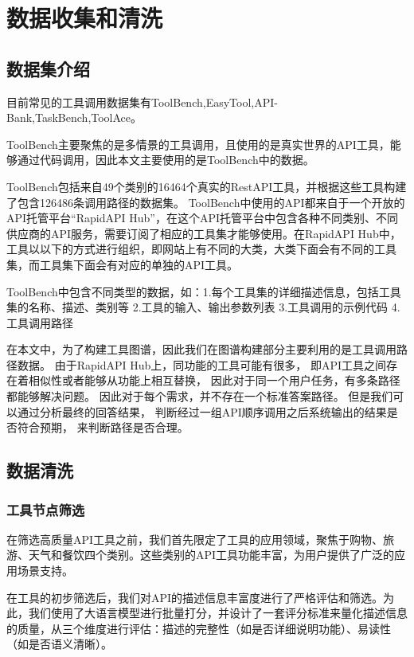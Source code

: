 \section{数据收集和清洗}

\subsection{数据集介绍}

目前常见的工具调用数据集有ToolBench\cite{Qin2023},EasyTool\cite{yuan2024easytool},API-Bank\cite{Li2023c},TaskBench\cite{shen2023taskbench},ToolAce\cite{liu2024toolace}。

ToolBench主要聚焦的是多情景的工具调用，且使用的是真实世界的API工具，能够通过代码调用，因此本文主要使用的是ToolBench中的数据。

ToolBench包括来自49个类别的16464个真实的RestAPI工具，并根据这些工具构建了包含126486条调用路径的数据集。
ToolBench中使用的API都来自于一个开放的API托管平台“RapidAPI Hub”，在这个API托管平台中包含各种不同类别、不同供应商的API服务，需要订阅了相应的工具集才能够使用。在RapidAPI Hub中，工具以以下的方式进行组织，即网站上有不同的大类，大类下面会有不同的工具集，而工具集下面会有对应的单独的API工具。

ToolBench中包含不同类型的数据，如：1.每个工具集的详细描述信息，包括工具集的名称、描述、类别等 2.工具的输入、输出参数列表 3.工具调用的示例代码 4.工具调用路径

在本文中，为了构建工具图谱，因此我们在图谱构建部分主要利用的是工具调用路径数据。
由于RapidAPI Hub上，同功能的工具可能有很多，
即API工具之间存在着相似性或者能够从功能上相互替换，
因此对于同一个用户任务，有多条路径都能够解决问题。
因此对于每个需求，并不存在一个标准答案路径。
但是我们可以通过分析最终的回答结果，
判断经过一组API顺序调用之后系统输出的结果是否符合预期，
来判断路径是否合理。

\subsection{数据清洗}

\subsubsection{工具节点筛选}

在筛选高质量API工具之前，我们首先限定了工具的应用领域，聚焦于购物、旅游、天气和餐饮四个类别。这些类别的API工具功能丰富，为用户提供了广泛的应用场景支持。

在工具的初步筛选后，我们对API的描述信息丰富度进行了严格评估和筛选。为此，我们使用了大语言模型进行批量打分，并设计了一套评分标准来量化描述信息的质量，从三个维度进行评估：描述的完整性（如是否详细说明功能）、易读性（如是否语义清晰）。

